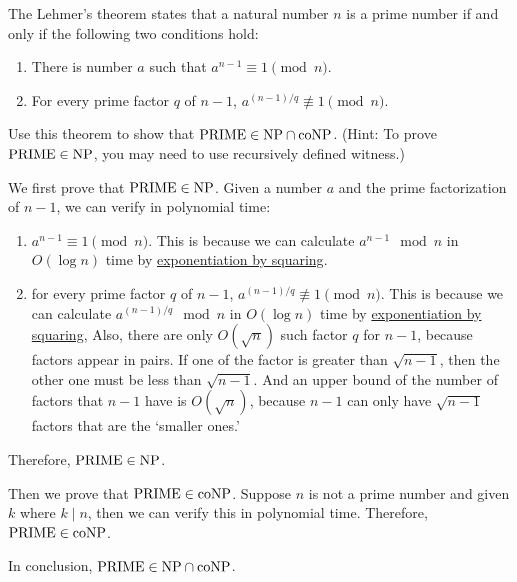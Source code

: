 \documentclass{homework}
\begin{document}
\begin{problem}
  The Lehmer's theorem states that a natural number $n$ is a prime number if and
  only if the following two conditions hold:
  \begin{enumerate}
    \item There is number $a$ such that $a^{n-1} \equiv 1 \pmod{n}$.
    \item For every prime factor $q$ of $n-1$, $a^{(n-1)/q} \not\equiv 1 \pmod{n}$.
  \end{enumerate}
  Use this theorem to show that $\mathrm{PRIME} \in \textup{NP} \cap \textup{coNP}$.
  (Hint: To prove $\mathrm{PRIME} \in \textup{NP}$, you may need to use recursively defined
  witness.)
\end{problem}

\begin{solution}

  We first prove that $\mathrm{PRIME} \in \textup{NP}$.
  Given a number $a$ and the prime factorization of $n-1$,
  we can verify in polynomial time:
  \begin{enumerate}
    \item $a^{n - 1} \equiv 1 \pmod{n}$.
      This is because we can calculate $a^{n-1} \mod n$ in $O(\log n)$ time
      by \href{https://en.wikipedia.org/wiki/Exponentiation_by_squaring}{exponentiation by squaring}.
    \item for every prime factor $q$ of $n-1$, $a^{(n-1)/q} \not\equiv 1 \pmod{n}$.
      This is because we can calculate $a^{(n-1)/q} \mod n$ in $O(\log n)$ time
      by \href{https://en.wikipedia.org/wiki/Exponentiation_by_squaring}{exponentiation by squaring},
      Also, there are only $O(\sqrt{n})$ such factor $q$ for $n - 1$,
      because factors appear in pairs.
      If one of the factor is greater than $\sqrt{n - 1}$,
      then the other one must be less than $\sqrt{n - 1}$.
      And an upper bound of the number of factors that $n - 1$ have is $O(\sqrt{n})$,
      because $n - 1$ can only have $\sqrt{n - 1}$ factors that are the `smaller ones.'
  \end{enumerate}
  Therefore, $\mathrm{PRIME} \in \textup{NP}$.

  Then we prove that $\mathrm{PRIME} \in \textup{coNP}$. Suppose $n$ is not a prime number
  and given $k$ where $k \mid n$, then we can verify this in polynomial time.
  Therefore, $\mathrm{PRIME} \in \textup{coNP}$.

  In conclusion, $\mathrm{PRIME} \in \textup{NP} \cap \textup{coNP}$.

\end{solution}
\end{document}
